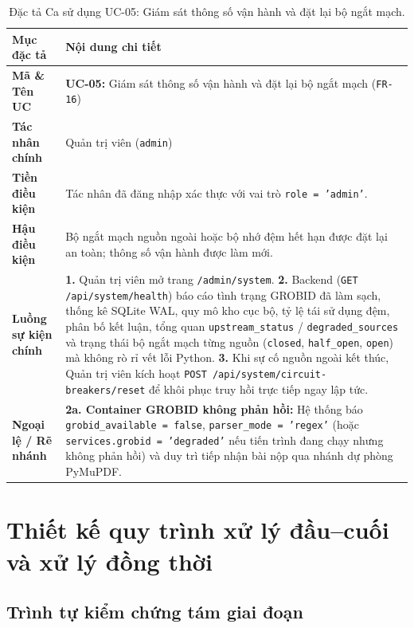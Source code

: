 \begin{table}[!htbp]
\centering
\caption{Đặc tả Ca sử dụng UC-05: Giám sát thông số vận hành và đặt lại bộ ngắt mạch.}\label{tab:uc05}
\begin{tabular}{|L{0.24}|L{0.76}|}
\hline
\textbf{Mục đặc tả} & \textbf{Nội dung chi tiết} \\
\hline
\textbf{Mã \& Tên UC} & \textbf{UC-05:} Giám sát thông số vận hành và đặt lại bộ ngắt mạch (\texttt{FR-16}) \\
\hline
\textbf{Tác nhân chính} & Quản trị viên (\texttt{admin}) \\
\hline
\textbf{Tiền điều kiện} & Tác nhân đã đăng nhập xác thực với vai trò \texttt{role = 'admin'}. \\
\hline
\textbf{Hậu điều kiện} & Bộ ngắt mạch nguồn ngoài hoặc bộ nhớ đệm hết hạn được đặt lại an toàn; thông số vận hành được làm mới. \\
\hline
\textbf{Luồng sự kiện chính} & \textbf{1.} Quản trị viên mở trang \texttt{/admin/system}. \newline \textbf{2.} Backend (\texttt{GET /api/system/health}) báo cáo tình trạng GROBID đã làm sạch, thống kê SQLite WAL, quy mô kho cục bộ, tỷ lệ tái sử dụng đệm, phân bố kết luận, tổng quan \texttt{upstream\_status} / \texttt{degraded\_sources} và trạng thái bộ ngắt mạch từng nguồn (\texttt{closed}, \texttt{half\_open}, \texttt{open}) mà không rò rỉ vết lỗi Python. \newline \textbf{3.} Khi sự cố nguồn ngoài kết thúc, Quản trị viên kích hoạt \texttt{POST /api/system/circuit-breakers/reset} để khôi phục truy hồi trực tiếp ngay lập tức. \\
\hline
\textbf{Ngoại lệ / Rẽ nhánh} & \textbf{2a. Container GROBID không phản hồi:} Hệ thống báo \texttt{grobid\_available = false}, \texttt{parser\_mode = 'regex'} (hoặc \texttt{services.grobid = 'degraded'} nếu tiến trình đang chạy nhưng không phản hồi) và duy trì tiếp nhận bài nộp qua nhánh dự phòng PyMuPDF. \\
\hline
\end{tabular}
\end{table}

\section{Thiết kế quy trình xử lý đầu--cuối và xử lý đồng thời}

\subsection{Trình tự kiểm chứng tám giai đoạn}


